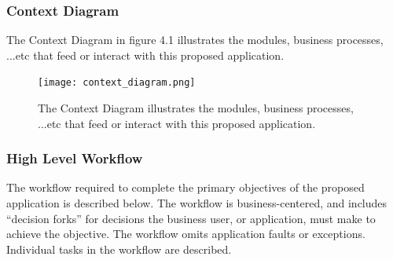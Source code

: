\subsubsection{Context Diagram}
The Context Diagram in figure 4.1 illustrates the modules, business processes, ...etc that feed 
or interact with this proposed application.
\begin{figure}[H]
  \centering
  \texttt{[image: context\_diagram.png]}
  \caption[The Context Diagram illustrates the modules, business processes, ...etc that feed 
or interact with this proposed application.] {The Context Diagram illustrates the modules, business processes, ...etc that feed 
or interact with this proposed application.}
\end{figure}


\newpage
\subsubsection{High Level Workflow}
The workflow required to complete the primary objectives of the proposed 
application is described below. The workflow is business-centered, and 
includes ``decision forks'' for decisions the business user, or application, 
must make to achieve the objective. The workflow omits application faults or exceptions. 
Individual tasks in the workflow are described.

